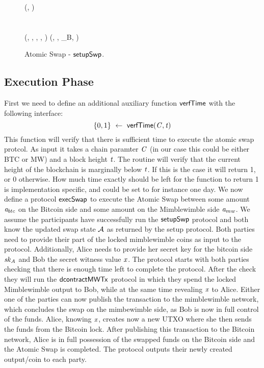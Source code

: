 \begin{landscape}
\begin{figure}
{{        (\varMwRefundTx, \funStarAlt{\varSpendableCoinAlice}) \< \< \< \< \varMwRefundTx \pcskipln \\
        \opFunResult \procDSharedInpMwTxL{\funStar{\varPtSpendableCoinAlice}}{\varAmountMW}{\varTimeMW} \< \< \< \< \opFunResult \procDSharedInpMwTxR{\funStar{\varPtSpendableCoinBob}}{\varAmountMW} \\
        \procPublishMW{\funArray{\varMwFundTx,\varMwRefundTx}}  \\
        \pcreturn (\varSwpState, \funStar{\varPtSpendableCoinAlice}, \funStar{\varSpendableCoinAlice}, \varSecKeyAlice, \funStarAlt{\varSpendableCoinAlice}) \< \< \< \< \pcreturn (\varSwpState, \funStar{\varPtSpendableCoinBob}, \varUTXO_{B}, \varWit)
        }
        }
        \caption{Atomic Swap - $\mathsf{setupSwp}$.}\label{fig:setup-swap}
    \end{figure}
\end{landscape}
\restoregeometry

\subsection{Execution Phase}\label{subsec:atom:exec}

First we need to define an additional auxiliary function $\mathsf{verfTime}$ with the following interface:
\[ \{0,1\} ~\leftarrow~ \mathsf{verfTime} (\mathit{C},\mathit{t}) \]
This function will verify that there is sufficient time to execute the atomic swap protcol.
As input it takes a chain paramter $\mathit{C}$ (in our case this could be either BTC or MW) and a block height $\mathit{t}$.
The routine will verify that the current height of the blockchain is marginally below $\mathit{t}$.
If this is the case it will return 1, or 0 otherwise.
How much time exactly should be left for the function to return 1 is implementation specific, and could be set to for instance one day.
We now define a protocol $\mathsf{execSwap}$ to execute the Atomic Swap between some amount $\mathit{a}_{btc}$ on the Bitcoin side and some amount on the Mimblewimble side $\mathit{a}_{mw}$.
We assume the participants have successfully run the $\mathsf{setupSwp}$ protocol and both know the updated swap state $\mathcal{A}$ as returned by the setup protocol.
Both parties need to provide their part of the locked mimblewimble coins as input to the protocol.
Additionally, Alice needs to provide her secret key for the bitcoin side $\mathit{sk}_{\mathit{A}}$ and Bob the secret witness value $\mathit{x}$.
The protocol starts with both parties checking that there is enough time left to complete the protocol.
After the check they will run the $\mathsf{dcontractMWTx}$ protocol in which they spend the locked Mimblewimble output to Bob, while at the same time revealing $\mathit{x}$ to Alice.
Either one of the parties can now publish the transaction to the mimblewimble network, which concludes the swap on the mimbewimble side, as Bob is now in full control of the funds.
Alice, knowing $\mathit{x}$, creates now a new UTXO where she then sends the funds from the Bitcoin lock.
After publishing this transaction to the Bitcoin network, Alice is in full possession of the swapped funds on the Bitcoin side and the Atomic Swap is completed.
The protocol outputs their newly created output/coin to each party.

